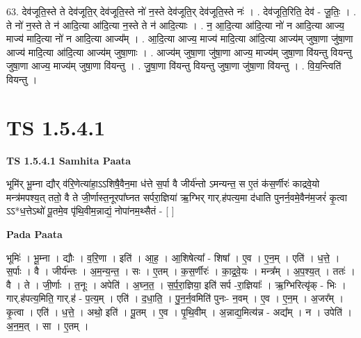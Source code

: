 \documentclass[17pt]{extarticle}
\begin{document}
63. देव॑जूति॒स्ते ते देव॑जूति॒र् देव॑जूति॒स्ते नो॑ न॒स्ते देव॑जूति॒र् देव॑जूति॒स्ते नः॑ । . देव॑जूति॒रिति॒ देव॑ - जू॒तिः॒ । . ते नो॑ न॒स्ते ते न॑ आदि॒त्या आ॑दि॒त्या न॒स्ते ते न॑ आदि॒त्याः । . न॒ आ॒दि॒त्या आ॑दि॒त्या नो॑ न आदि॒त्या आज्य॒ माज्य॑ मादि॒त्या नो॑ न आदि॒त्या आज्य᳚म् । . आ॒दि॒त्या आज्य॒ माज्य॑ मादि॒त्या आ॑दि॒त्या आज्य॑म् जुषा॒णा जु॑षा॒णा आज्य॑ मादि॒त्या आ॑दि॒त्या आज्य॑म् जुषा॒णाः । . आज्य॑म् जुषा॒णा जु॑षा॒णा आज्य॒ माज्य॑म् जुषा॒णा वि॑यन्तु वियन्तु जुषा॒णा आज्य॒ माज्य॑म् जुषा॒णा वि॑यन्तु । . जु॒षा॒णा वि॑यन्तु वियन्तु जुषा॒णा जु॑षा॒णा वि॑यन्तु । . वि॒य॒न्त्विति॑ वियन्तु । \newline
\pagebreak
{}
\section*{ TS 1.5.4.1 }

\textbf{TS 1.5.4.1 } \newline
\textbf{Samhita Paata} \newline

भूमि॑र् भू॒म्ना द्यौर् व॑रि॒णेत्या॑हा॒ऽऽशिषै॒वैन॒मा ध॑त्ते स॒र्पा वै जीर्य॑न्तो ऽमन्यन्त॒ स ए॒तं क॑स॒र्णीरः॑ काद्रवे॒यो मन्त्र॑मपश्य॒त् ततो॒ वै ते जी॒र्णास्त॒नूरपा᳚घ्नत सर्परा॒ज्ञिया॑ ऋ॒ग्भिर् गार्.ह॑पत्य॒मा द॑धाति पुनर्न॒वमे॒वैन॑म॒जरं॑ कृ॒त्वा ऽऽ*ध॒त्तेऽथो॑ पू॒तमे॒व पृ॑थि॒वीम॒न्नाद्यं॒ नोपा॑नम॒थ्सैतं - [ ] \newline

\textbf{Pada Paata} \newline

भूमिः॑ । भू॒म्ना । द्यौः । व॒रि॒णा । इति॑ । आ॒ह॒ । आ॒शिषेत्या᳚ - शिषा᳚ । ए॒व । ए॒न॒म् । एति॑ । ध॒त्ते॒ । स॒र्पाः । वै । जीर्य॑न्तः । अ॒म॒न्य॒न्त॒ । सः । ए॒तम् । क॒स॒र्णीरः॑ । का॒द्र॒वे॒यः । मन्त्र᳚म् । अ॒प॒श्य॒त् । ततः॑ । वै । ते । जी॒र्णाः । त॒नूः । अपेति॑ । अ॒घ्न॒त॒ । स॒र्प॒रा॒ज्ञिया॒ इति॑ सर्प -रा॒ज्ञियाः᳚ । ऋ॒ग्भिरित्यृ॑क् - भिः । गार्.ह॑पत्य॒मिति॒ गार्.ह॑ - प॒त्य॒म् । एति॑ । द॒धा॒ति॒ । पु॒न॒र्न॒वमिति॑ पुनः- न॒वम् । ए॒व । ए॒न॒म् । अ॒जर᳚म् । कृ॒त्वा । एति॑ । ध॒त्ते॒ । अथो॒ इति॑ । पू॒तम् । ए॒व । पृ॒थि॒वीम् । अ॒न्नाद्य॒मित्य॑न्न - अद्य᳚म् । न । उपेति॑ । अ॒न॒म॒त् । सा । ए॒तम् ।  \newline
\end{document}
